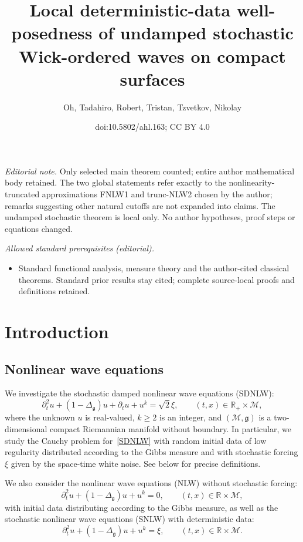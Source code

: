 \documentclass[10pt]{amsart}
\title{Local deterministic-data well-posedness of undamped stochastic Wick-ordered waves on compact surfaces}
\author{Oh, Tadahiro, Robert, Tristan, Tzvetkov, Nikolay}
\date{doi:10.5802/ahl.163; CC BY 4.0}
\theoremstyle{definition}\newtheorem{defi}[theo]{Definition}\newtheorem{rema}[theo]{Remark}\newtheorem{exam}[theo]{Example}\newtheorem{exem}[theo]{Example}\newtheorem{nota}[theo]{Notation}
\newcommand{\R}{\mathbb{R}}
\newcommand{\M}{\mathcal{M}}
\newcommand{\g}{\mathfrak{g}}
\newcommand{\Dlg}{\Delta_{\g}}
\newcommand{\dt}{\partial_t}
\begin{document}
\maketitle
\noindent\textit{Editorial note.} Only selected main theorem counted; entire author mathematical body retained. The two global statements refer exactly to the nonlinearity-truncated approximations FNLW1 and trunc-NLW2 chosen by the author; remarks suggesting other natural cutoffs are not expanded into claims. The undamped stochastic theorem is local only. No author hypotheses, proof steps or equations changed.\par\medskip
\noindent\textit{Allowed standard prerequisites (editorial).}\begin{itemize}
\item Standard functional analysis, measure theory and the author-cited classical theorems. Standard prior results stay cited; complete source-local proofs and definitions retained.
\end{itemize}\medskip

\section{Introduction}

\subsection{Nonlinear wave equations}
We investigate the stochastic damped nonlinear wave equations (SDNLW):
\begin{equation}\label{SDNLW}
\dt^2 u + (1 - \Dlg) u + \dt u + u^k = \sqrt{2}\xi,
\qquad (t,x) \in \R_+ \times \M,
\end{equation}
where the unknown $u$ is real-valued, $k \geq 2$ is an integer, and $(\M,\g)$ is a two-dimensional compact Riemannian manifold without boundary. In particular, we study the Cauchy problem for~\eqref{SDNLW} with random initial data of low regularity distributed according to the Gibbs measure and with stochastic forcing $\xi$ given by the space-time white noise. See below for precise definitions.

We also consider the nonlinear wave equations (NLW) without stochastic forcing:
\begin{equation}\label{NLW}
\dt^2 u + (1 - \Dlg) u + u^k = 0,
\qquad (t,x) \in \R \times \M,
\end{equation}
with initial data distributing according to the Gibbs measure, as well as the stochastic nonlinear wave equations (SNLW) with deterministic data:
\begin{equation}\label{SNLW}
\dt^2 u + (1 - \Dlg) u + u^k = \xi,
\qquad (t,x) \in \R \times \M.
\end{equation}
\end{document}
